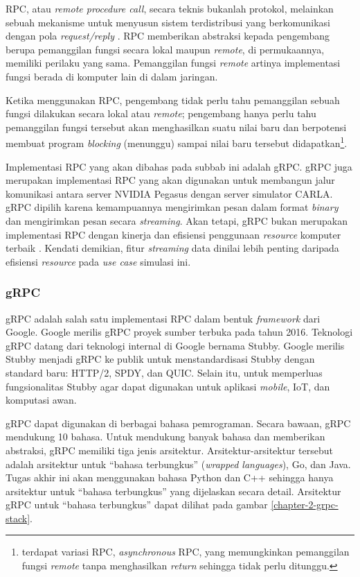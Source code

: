 RPC, atau \textit{remote procedure call}, secara teknis bukanlah protokol,
melainkan sebuah mekanisme untuk menyusun sistem terdistribusi yang
berkomunikasi dengan pola \textit{request/reply}
\parencite{larry_computerNetwork}. RPC memberikan abstraksi kepada pengembang
berupa pemanggilan fungsi secara lokal maupun \textit{remote}, di permukaannya,
memiliki perilaku yang sama. Pemanggilan fungsi \textit{remote} artinya
implementasi fungsi berada di komputer lain di dalam jaringan.

Ketika menggunakan RPC, pengembang tidak perlu tahu pemanggilan sebuah fung\-si
dilakukan secara lokal atau \textit{remote}; pengembang hanya perlu tahu
pemanggilan fungsi tersebut akan menghasilkan suatu nilai baru dan berpotensi
membuat program \textit{blocking} (menunggu) sampai nilai baru tersebut
didapatkan\footnote{terdapat variasi RPC, \textit{asynchronous} RPC, yang
    memungkinkan pemanggilan fungsi \textit{remote} tanpa menghasilkan
    \textit{return} sehingga tidak perlu ditunggu.}.

Implementasi RPC yang akan dibahas pada subbab ini adalah gRPC. gRPC juga
merupakan implementasi RPC yang akan digunakan untuk membangun jalur komunikasi
antara server NVIDIA Pegasus dengan server simulator CARLA. gRPC dipilih karena
kemampuannya mengirimkan pesan dalam format \textit{binary} dan mengirimkan
pesan secara \textit{streaming}. Akan tetapi, gRPC bukan merupakan implementasi
RPC dengan kinerja dan efisiensi penggunaan \textit{resource} komputer terbaik
\parencite{chris_rpc_benchmark}. Kendati demikian, fitur \textit{streaming} data
dinilai lebih penting daripada efisiensi \textit{resource} pada \textit{use
    case} simulasi ini.

\subsubsection{gRPC}

gRPC adalah salah satu implementasi RPC dalam bentuk \textit{framework} dari
Google. Google merilis gRPC proyek sumber terbuka pada tahun 2016. Teknologi
gRPC datang dari teknologi internal di Google bernama Stubby. Google merilis
Stubby menjadi gRPC ke publik untuk menstandardisasi Stubby dengan standard
baru: HTTP/2, SPDY, dan QUIC. Selain itu, untuk memperluas fungsionalitas Stubby
agar dapat digunakan untuk aplikasi \textit{mobile}, IoT, dan komputasi awan.

gRPC dapat digunakan di berbagai bahasa pemrograman. Secara bawaan, gRPC
mendukung 10 bahasa. Untuk mendukung banyak bahasa dan memberikan abstraksi,
gRPC memiliki tiga jenis arsitektur. Arsitektur-arsitektur tersebut adalah
arsitektur untuk ``bahasa terbungkus'' (\textit{wrapped languages}), Go, dan
Java. Tugas akhir ini akan menggunakan bahasa Python dan C++ sehingga hanya
arsitektur untuk ``bahasa terbungkus'' yang dijelaskan secara detail. Arsitektur
gRPC untuk ``bahasa terbungkus'' dapat dilihat pada gambar
\ref{chapter-2-grpc-stack}.

